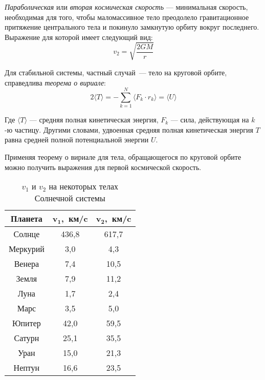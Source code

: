 \textit{Параболическая} или \textit{вторая космическая скорость} --- минимальная скорость, необходимая для того, чтобы маломассивное тело преодолело гравитационное притяжение центрального тела и покинуло замкнутую орбиту вокруг последнего. Выражение для которой имеет следующий вид:\begin{equation}
v_{2}=\sqrt{\frac{2GM}{r}}
\end{equation}

Для стабильной системы, частный случай~--- тело на круговой орбите, справедлива {\itshape теорема о вириале}:
\begin{equation}
2 \langle T\rangle 
= -\sum _{{k=1}}^{N}\langle {F}_{k}\cdot {r}_{k}\rangle 
= \langle U \rangle
\end{equation}

Где $\langle T\rangle$ --- средняя полная кинетическая энергия, $F_k$ --- сила, действующая на $k$-ю частицу. Другими словами, удвоенная средняя полная кинетическая энергия $T$ равна средней полной потенциальной энергии $U$. 

Применяя теорему о вириале для тела, обращающегося по круговой орбите можно получить выражения для первой космической скорость.

\begin{table}[h!]
\centering
\begin{tabular}{|c|c|c|}
\hline
\textbf{Планета} & $\mathbf{v_1}$,~\textbf{км/c} & $\mathbf{v_2}$,~\textbf{км/c}\\
\hline
Солнце & 436,8 & 617,7\\
\hline
Меркурий & 3,0 & 4,3\\
\hline
Венера & 7,4 & 10,5\\
\hline
Земля & 7,9 & 11,2\\
\hline
Луна & 1,7 & 2,4\\
\hline
Марс & 3,5 & 5,0\\
\hline
Юпитер & 42,0 & 59,5\\
\hline
Сатурн & 25,1 & 35,5\\
\hline
Уран & 15,0 & 21,3\\
\hline
Нептун & 16,6 & 23,5\\
\hline
\end{tabular}
\caption{$v_1$ и $v_2$ на некоторых телах Солнечной системы}
\end{table}




